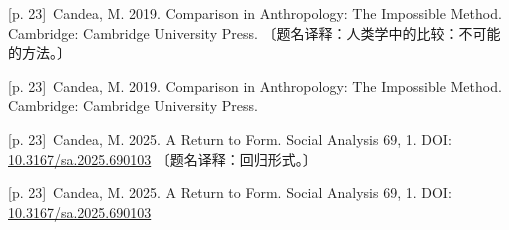 \documentclass[10pt,a4paper]{article}
\begin{document}
\noindent\begin{minipage}{\textwidth}\begin{minipage}[t]{\dimexpr.5\textwidth-4mm\relax}\noindent\begin{minipage}[t]{\linewidth}{\scriptsize\color{gray} [p. 23]}\ Candea, M. 2019. Comparison in Anthropology: The Impossible Method. Cambridge: Cambridge University Press. 〔题名译释：人类学中的比较：不可能的方法。〕\par\end{minipage}\par\end{minipage}\hfill\begin{minipage}[t]{\dimexpr.5\textwidth-4mm\relax}\noindent\begin{minipage}[t]{\linewidth}{\scriptsize\color{gray} [p. 23]}\ Candea, M. 2019. Comparison in Anthropology: The Impossible Method. Cambridge: Cambridge University Press.\par\end{minipage}\par\end{minipage}\end{minipage}\par
\noindent\begin{minipage}{\textwidth}\begin{minipage}[t]{\dimexpr.5\textwidth-4mm\relax}\noindent\begin{minipage}[t]{\linewidth}{\scriptsize\color{gray} [p. 23]}\ Candea, M. 2025. A Return to Form. Social Analysis 69, 1. DOI: \url{10.3167/sa.2025.690103} 〔题名译释：回归形式。〕\par\end{minipage}\par\end{minipage}\hfill\begin{minipage}[t]{\dimexpr.5\textwidth-4mm\relax}\noindent\begin{minipage}[t]{\linewidth}{\scriptsize\color{gray} [p. 23]}\ Candea, M. 2025. A Return to Form. Social Analysis 69, 1. DOI: \url{10.3167/sa.2025.690103}\par\end{minipage}\par\end{minipage}\end{minipage}\par
\end{document}
